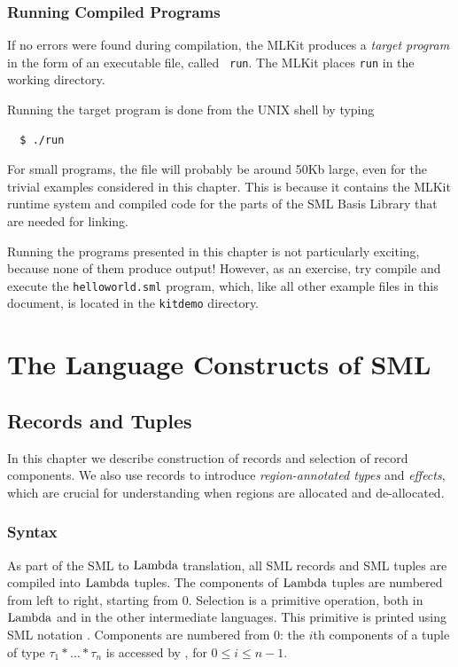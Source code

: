 \documentclass[12pt]{book}
\begin{document}
\section{Running Compiled Programs}
If no errors were found during compilation, the MLKit produces a
%
{\em target program} in the form of an executable file, called {\tt
  run}. The MLKit places {\tt run} in the working directory.

Running the target program is done from the UNIX shell by typing
%
\begin{verbatim}
  $ ./run
\end{verbatim}
For small programs, the file will probably be around 50Kb large, even
for the trivial examples considered in this chapter.  This is because
it contains the MLKit runtime system and compiled code for the parts of
the SML Basis Library that are needed for linking.

Running the programs presented in this chapter is not particularly
exciting, because none of them produce output! However, as an
exercise, try compile and execute the
%
{\tt helloworld.sml} program, which, like all other example files in
this document, is located in the
%
{\tt kitdemo} directory.


\part{The Language Constructs of SML}
\label{understanding.sec}

\chapter{Records and Tuples}
\label{records.sec}
In this chapter we describe construction of
%
records and selection of record components. We also use records to
introduce
%
{\em region-annotated types} and
%
{\em effects}, which are crucial for understanding when regions are
allocated and de-allocated.

\section{Syntax}
As part of the SML to
%
$\hbox{\rm Lambda}$ translation, all SML records and SML tuples are compiled into
$\hbox{\rm Lambda}$ tuples. The components of $\hbox{\rm Lambda}$ tuples are numbered from left
to right, starting from 0.  Selection is a primitive operation, both
in $\hbox{\rm Lambda}$ and in the other intermediate languages. This primitive is
printed using SML notation . Components are numbered from
0: the $i$th components of a tuple of type
$\tau_1\ast\ldots\ast\tau_n$ is accessed by , for $0\leq
i\leq n-1$.
\end{document}
